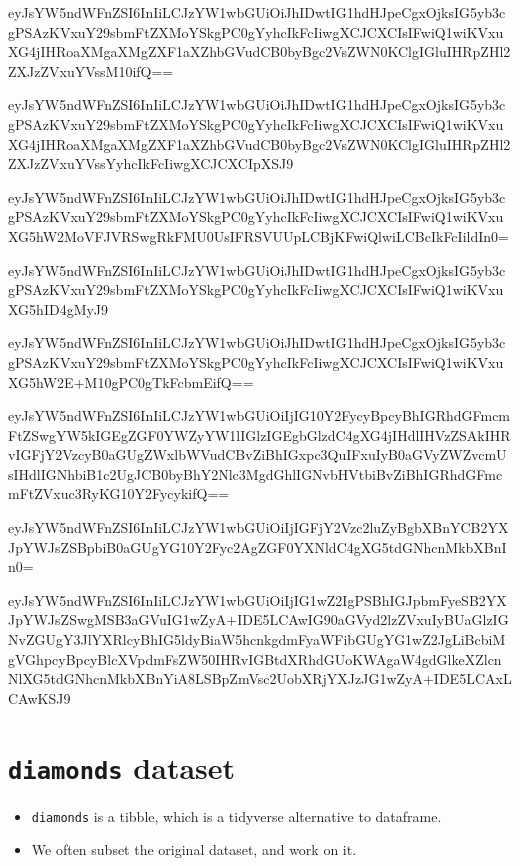 \documentclass[]{book}
\providecommand{\tightlist}{%
  \setlength{\itemsep}{0pt}\setlength{\parskip}{0pt}}
\begin{document}
eyJsYW5ndWFnZSI6InIiLCJzYW1wbGUiOiJhIDwtIG1hdHJpeCgxOjksIG5yb3cgPSAzKVxuY29sbmFtZXMoYSkgPC0gYyhcIkFcIiwgXCJCXCIsIFwiQ1wiKVxuXG4jIHRoaXMgaXMgZXF1aXZhbGVudCB0byBgc2VsZWN0KClgIGluIHRpZHl2ZXJzZVxuYVssM10ifQ==

eyJsYW5ndWFnZSI6InIiLCJzYW1wbGUiOiJhIDwtIG1hdHJpeCgxOjksIG5yb3cgPSAzKVxuY29sbmFtZXMoYSkgPC0gYyhcIkFcIiwgXCJCXCIsIFwiQ1wiKVxuXG4jIHRoaXMgaXMgZXF1aXZhbGVudCB0byBgc2VsZWN0KClgIGluIHRpZHl2ZXJzZVxuYVssYyhcIkFcIiwgXCJCXCIpXSJ9

eyJsYW5ndWFnZSI6InIiLCJzYW1wbGUiOiJhIDwtIG1hdHJpeCgxOjksIG5yb3cgPSAzKVxuY29sbmFtZXMoYSkgPC0gYyhcIkFcIiwgXCJCXCIsIFwiQ1wiKVxuXG5hW2MoVFJVRSwgRkFMU0UsIFRSVUUpLCBjKFwiQlwiLCBcIkFcIildIn0=

eyJsYW5ndWFnZSI6InIiLCJzYW1wbGUiOiJhIDwtIG1hdHJpeCgxOjksIG5yb3cgPSAzKVxuY29sbmFtZXMoYSkgPC0gYyhcIkFcIiwgXCJCXCIsIFwiQ1wiKVxuXG5hID4gMyJ9

eyJsYW5ndWFnZSI6InIiLCJzYW1wbGUiOiJhIDwtIG1hdHJpeCgxOjksIG5yb3cgPSAzKVxuY29sbmFtZXMoYSkgPC0gYyhcIkFcIiwgXCJCXCIsIFwiQ1wiKVxuXG5hW2E+M10gPC0gTkFcbmEifQ==

eyJsYW5ndWFnZSI6InIiLCJzYW1wbGUiOiIjIG10Y2FycyBpcyBhIGRhdGFmcmFtZSwgYW5kIGEgZGF0YWZyYW1lIGlzIGEgbGlzdC4gXG4jIHdlIHVzZSAkIHRvIGFjY2VzcyB0aGUgZWxlbWVudCBvZiBhIGxpc3QuIFxuIyB0aGVyZWZvcmUsIHdlIGNhbiB1c2UgJCB0byBhY2Nlc3MgdGhlIGNvbHVtbiBvZiBhIGRhdGFmcmFtZVxuc3RyKG10Y2FycykifQ==

eyJsYW5ndWFnZSI6InIiLCJzYW1wbGUiOiIjIGFjY2Vzc2luZyBgbXBnYCB2YXJpYWJsZSBpbiB0aGUgYG10Y2Fyc2AgZGF0YXNldC4gXG5tdGNhcnMkbXBnIn0=

eyJsYW5ndWFnZSI6InIiLCJzYW1wbGUiOiIjIG1wZ2IgPSBhIGJpbmFyeSB2YXJpYWJsZSwgMSB3aGVuIG1wZyA+IDE5LCAwIG90aGVyd2lzZVxuIyBUaGlzIGNvZGUgY3JlYXRlcyBhIG5ldyBiaW5hcnkgdmFyaWFibGUgYG1wZ2JgLiBcbiMgVGhpcyBpcyBlcXVpdmFsZW50IHRvIGBtdXRhdGUoKWAgaW4gdGlkeXZlcnNlXG5tdGNhcnMkbXBnYiA8LSBpZmVsc2UobXRjYXJzJG1wZyA+IDE5LCAxLCAwKSJ9

\hypertarget{diamonds-dataset}{%
\section{\texorpdfstring{\texttt{diamonds} dataset}{diamonds dataset}}\label{diamonds-dataset}}

\begin{itemize}
\tightlist
\item
  \texttt{diamonds} is a tibble, which is a tidyverse alternative to dataframe.
\item
  We often subset the original dataset, and work on it.
\end{itemize}
\end{document}
